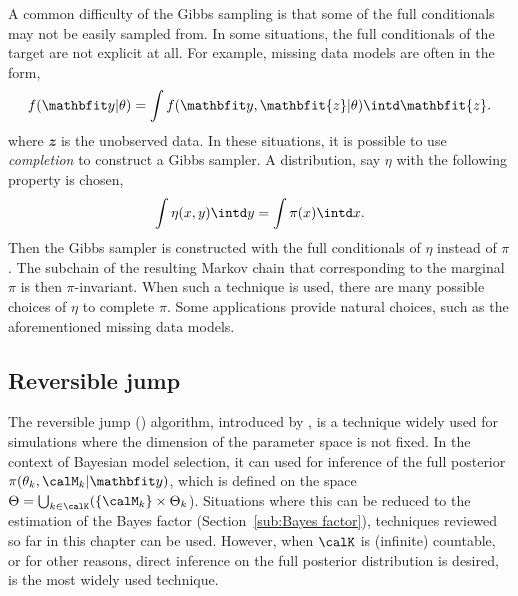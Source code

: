 A common difficulty of the Gibbs sampling is that some of the full
conditionals may not be easily sampled from. In some situations, the full
conditionals of the target are not explicit at all. For example, missing data
models are often in the form,
\begin{equation*}
  f(\data|\theta) = \int f(\data, \mathbfit{z}|\theta)\intd \mathbfit{z}.
\end{equation*}
where $\mathbfit{z}$ is the unobserved data. In these situations, it is
possible to use \emph{completion} to construct a Gibbs sampler. A
distribution, say $\eta$ with the following property is chosen,
\begin{equation}
  \int\eta(x,y)\intd y = \int\pi(x)\intd x.
\end{equation}
Then the Gibbs sampler is constructed with the full conditionals of $\eta$
instead of $\pi$. The subchain of the resulting Markov chain that
corresponding to the marginal $\pi$ is then $\pi$-invariant. When such a
technique is used, there are many possible choices of $\eta$ to complete
$\pi$. Some applications provide natural choices, such as the aforementioned
missing data models.

\subsection{Reversible jump \protect\mcmc}
\label{sub:Reversible jump mcmc}

The reversible jump \mcmc (\rjmcmc) algorithm, introduced by
\cite{Green:1995dg}, is a technique widely used for simulations where the
dimension of the parameter space is not fixed. In the context of Bayesian
model selection, it can used for inference of the full posterior
$\pi(\theta_k,\calM_k|\data)$, which is defined on the space $\Theta =
\bigcup_{k\in\calK}(\{\calM_k\}\times\Theta_k$). Situations where this can be
reduced to the estimation of the Bayes factor (Section~\ref{sub:Bayes
  factor}), techniques reviewed so far in this chapter can be used. However,
when $\calK$ is (infinite) countable, or for other reasons, direct inference
on the full posterior distribution is desired, \rjmcmc is the most widely used
technique.


